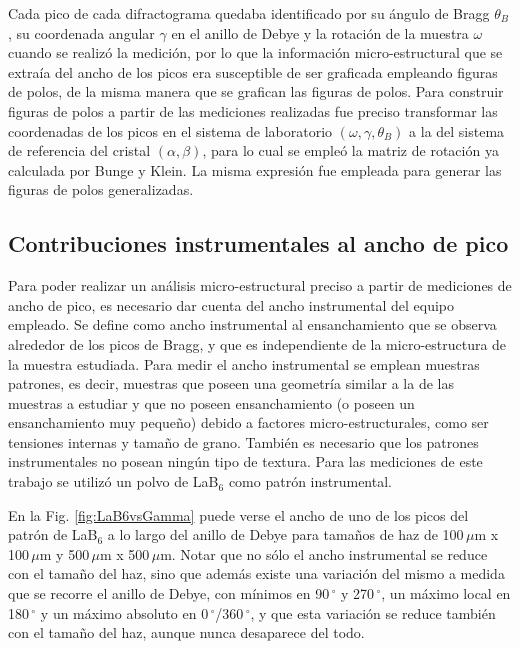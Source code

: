 Cada pico de cada difractograma quedaba identificado por su ángulo de Bragg $\theta_B$, su coordenada angular $\gamma$ en el anillo de Debye y la rotación de la muestra $\omega$ cuando se realizó la medición, por lo que la información micro-estructural que se extraía del ancho de los picos era susceptible de ser graficada empleando figuras de polos, de la misma manera que se grafican las figuras de polos.
Para construir figuras de polos a partir de las mediciones realizadas fue preciso transformar las coordenadas de los picos en el sistema de laboratorio $(\omega, \gamma, \theta_B)$ a la del sistema de referencia del cristal $(\alpha, \beta)$, para lo cual se empleó la matriz de rotación ya calculada por Bunge y Klein\cite{Bunge1996}.
La misma expresión fue empleada para generar las figuras de polos generalizadas.

\subsection{Contribuciones instrumentales al ancho de pico}\label{SS:inst}
Para poder realizar un análisis micro-estructural preciso a partir de mediciones de ancho de pico, es necesario dar cuenta del ancho instrumental del equipo empleado.
Se define como ancho instrumental al ensanchamiento que se observa alrededor de los picos de Bragg, y que es independiente de la micro-estructura de la muestra estudiada.
Para medir el ancho instrumental se emplean muestras patrones, es decir, muestras que poseen una geometría similar a la de las muestras a estudiar y que no poseen ensanchamiento (o poseen un ensanchamiento muy pequeño) debido a factores micro-estructurales, como ser tensiones internas y tamaño de grano.
También es necesario que los patrones instrumentales no posean ningún tipo de textura.
Para las mediciones de este trabajo se utilizó un polvo de LaB$_6$ como patrón instrumental.

En la Fig. \ref{fig:LaB6vsGamma} puede verse el ancho de uno de los picos del patrón de LaB$_6$ a lo largo del anillo de Debye para tamaños de haz de 100\,$\mu$m x 100\,$\mu$m y 500\,$\mu$m x 500\,$\mu$m.
Notar que no sólo el ancho instrumental se reduce con el tamaño del haz, sino que además existe una variación del mismo a medida que se recorre el anillo de Debye, con mínimos en 90\,$^{\circ}$ y 270\,$^{\circ}$, un máximo local en 180\,$^{\circ}$ y un máximo absoluto en 0\,$^{\circ}$/360\,$^{\circ}$, y que esta variación se reduce también con el tamaño del haz, aunque nunca desaparece del todo.

